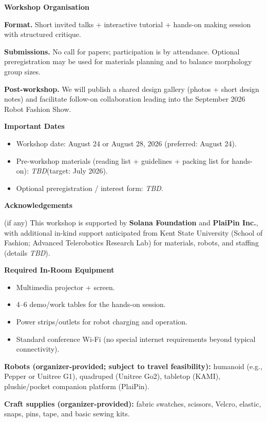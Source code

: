 \documentclass[12pt,letterpaper]{article}
\newcommand{\FormSection}[1]{\par\vspace{0.75\baselineskip}\noindent\textbf{#1}\par}
\newcommand{\TBD}{\textit{TBD}}
\begin{document}
\FormSection{Workshop Organisation}
\textbf{Format.} Short invited talks + interactive tutorial + hands-on making session with structured critique.

\textbf{Submissions.} No call for papers; participation is by attendance. Optional preregistration may be used for materials planning and to balance morphology group sizes.

\textbf{Post-workshop.} We will publish a shared design gallery (photos + short design notes) and facilitate follow-on collaboration leading into the September 2026 Robot Fashion Show.

\FormSection{Important Dates}
\begin{itemize}
  \item Workshop date: August 24 or August 28, 2026 (preferred: August 24).
  \item Pre-workshop materials (reading list + guidelines + packing list for hands-on): \TBD (target: July 2026).
  \item Optional preregistration / interest form: \TBD.
\end{itemize}

\FormSection{Acknowledgements}
(if any) This workshop is supported by \textbf{Solana Foundation} and \textbf{PlaiPin Inc.}, with additional in-kind support anticipated from Kent State University (School of Fashion; Advanced Telerobotics Research Lab) for materials, robots, and staffing (details \TBD).

\FormSection{Required In-Room Equipment}
\begin{itemize}
  \item Multimedia projector + screen.
  \item 4--6 demo/work tables for the hands-on session.
  \item Power strips/outlets for robot charging and operation.
  \item Standard conference Wi-Fi (no special internet requirements beyond typical connectivity).
\end{itemize}

\textbf{Robots (organizer-provided; subject to travel feasibility):} humanoid (e.g., Pepper or Unitree G1), quadruped (Unitree Go2), tabletop (KAMI), plushie/pocket companion platform (PlaiPin).

\textbf{Craft supplies (organizer-provided):} fabric swatches, scissors, Velcro, elastic, snaps, pins, tape, and basic sewing kits.
\end{document}
